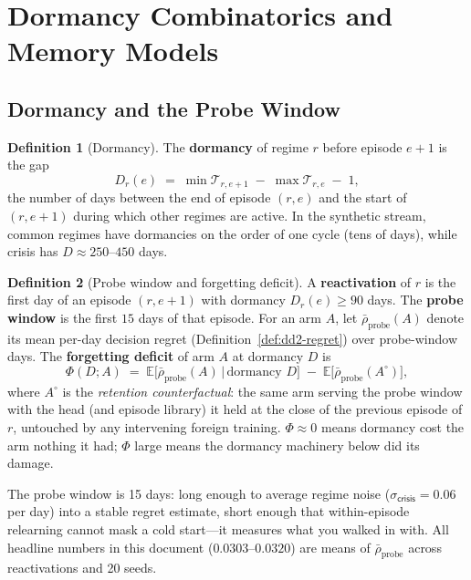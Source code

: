 \documentclass[11pt,a4paper]{article}
\theoremstyle{definition}
\newtheorem{definition}{Definition}[section]
\theoremstyle{plain}
\newcommand{\E}{\mathbb{E}}
\begin{document}
\section{Dormancy Combinatorics and Memory Models}
\label{sec:dd2-dormancy}

\subsection{Dormancy and the Probe Window}

\begin{definition}[Dormancy]
\label{def:dd2-dormancy}
The \textbf{dormancy} of regime $r$ before episode $e+1$ is the gap
\[
D_r(e) \;=\; \min \mathcal{T}_{r,e+1} \;-\; \max \mathcal{T}_{r,e} \;-\; 1,
\]
the number of days between the end of episode $(r,e)$ and the start of
$(r,e+1)$ during which other regimes are active. In the synthetic stream,
common regimes have dormancies on the order of one cycle (tens of days),
while \textsf{crisis} has $D \approx 250$--$450$ days.
\end{definition}

\begin{definition}[Probe window and forgetting deficit]
\label{def:dd2-probe}
A \textbf{reactivation} of $r$ is the first day of an episode $(r, e+1)$ with
dormancy $D_r(e) \ge 90$ days. The \textbf{probe window} is the first
$15$ days of that episode. For an arm $A$, let
$\bar\rho_{\mathrm{probe}}(A)$ denote its mean per-day decision regret
(Definition~\ref{def:dd2-regret}) over probe-window days. The
\textbf{forgetting deficit} of arm $A$ at dormancy $D$ is
\begin{equation}
\label{eq:dd2-phi}
\Phi(D; A) \;=\;
\E\bigl[\bar\rho_{\mathrm{probe}}(A) \,\big|\, \text{dormancy } D\bigr]
\;-\;
\E\bigl[\bar\rho_{\mathrm{probe}}(A^{\circ})\bigr],
\end{equation}
where $A^{\circ}$ is the \emph{retention counterfactual}: the same arm
serving the probe window with the head (and episode library) it held at the
close of the previous episode of $r$, untouched by any intervening foreign
training. $\Phi \approx 0$ means dormancy cost the arm nothing it had;
$\Phi$ large means the dormancy machinery below did its damage.
\end{definition}

The probe window is 15 days: long enough to average regime noise
($\sigma_{\textsf{crisis}} = 0.06$ per day) into a stable regret estimate,
short enough that within-episode relearning cannot mask a cold start---it
measures what you walked in with. All headline numbers in this document
($0.0303$--$0.0320$) are means of $\bar\rho_{\mathrm{probe}}$ across
reactivations and 20 seeds.
\end{document}
